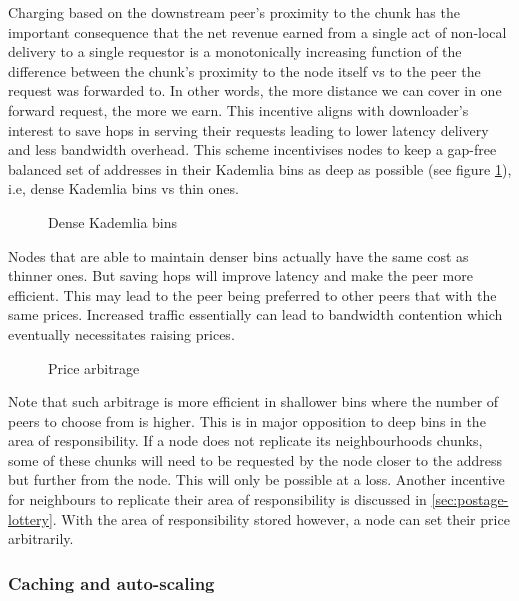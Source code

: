 Charging based on the downstream peer's proximity to the chunk has the important consequence that the net revenue earned from a single act of non-local delivery to a single requestor is a monotonically increasing function of the difference between the chunk's proximity to the node itself vs to the peer the request was forwarded to. In other words, the more distance we can cover in one forward request, the more we earn. This incentive aligns with downloader's interest to save hops in serving their requests leading to lower latency delivery and less bandwidth overhead. This scheme incentivises nodes to keep a gap-free balanced set of addresses in their Kademlia bins as deep as possible (see figure \ref{fig:densebins}), i.e, dense Kademlia bins vs thin ones.

\begin{figure}[htbp]
   \centering
   \caption[Dense Kademlia bins]{Dense Kademlia bins}
   \label{fig:densebins}
\end{figure}


Nodes that are able to maintain denser bins actually have the same cost as thinner ones. But saving hops will improve latency and make the peer more efficient. This may lead to the peer being preferred to other peers that with the same prices. Increased traffic essentially can lead to bandwidth contention which eventually necessitates raising prices. 

\begin{figure}[htbp]
   \centering
   \caption[Price arbitrage]{Price arbitrage}
   \label{fig:pricearbitrage}
\end{figure}

Note that such arbitrage is more efficient in shallower bins where the number of peers to choose from is higher. This is in major opposition to deep bins in the area of responsibility. If a node does not replicate its neighbourhoods chunks, some of these chunks will need to be requested by the node closer to the address but further from the node. This will only be possible at a loss. Another incentive for neighbours to replicate their area of responsibility is discussed in \ref{sec:postage-lottery}. With the area of responsibility stored however, a node can set their price arbitrarily. 


\subsubsection{Caching and auto-scaling}\label{sec:caching}

